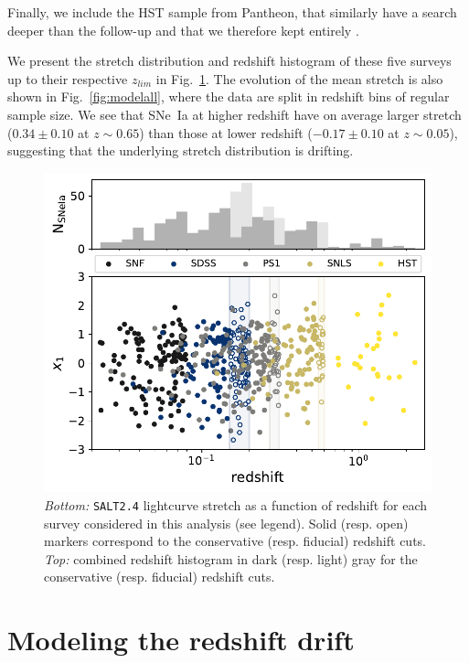 \documentclass[]{aa} %
\newcommand{\mr}[1]{{\textcolor[rgb]{0.60,0.10,0.6}{#1}}}
\begin{document}
Finally, we include the HST sample from Pantheon, that similarly have a search
deeper than the follow-up and that we therefore kept entirely
\citep{strolger04}.

We present the stretch distribution and redshift histogram of these five surveys
up to their respective $z_{lim}$ in Fig.~\ref{fig:sample}. \mr{The evolution of the mean stretch is also shown in Fig.~\ref{fig:modelall}, where the data are split in redshift bins of regular sample size. We see that SNe~Ia at higher redshift have on average larger stretch ($0.34 \pm 0.10$ at $z\sim0.65$) than those at lower redshift ($-0.17\pm 0.10$ at $z\sim0.05$), suggesting that the underlying stretch distribution is drifting.}

\begin{figure}
    \centering
    \includegraphics[width=0.95\linewidth]{Article_figures/stretchs-cut_btw_hist_cumu_75-lb-cividis.pdf}
    \caption{\textit{Bottom:} \textsc{\texttt{SALT2.4}} lightcurve stretch as a
        function of redshift for each survey considered in this analysis (see
        legend). Solid (resp. open) markers correspond to the conservative
        (resp. fiducial) redshift cuts. \textit{Top:} combined redshift
    histogram in dark (resp. light) gray for the conservative (resp. fiducial)
redshift cuts.}
    \label{fig:sample}
\end{figure}

\section{Modeling the redshift drift}\label{sec:modeling}
\end{document}
